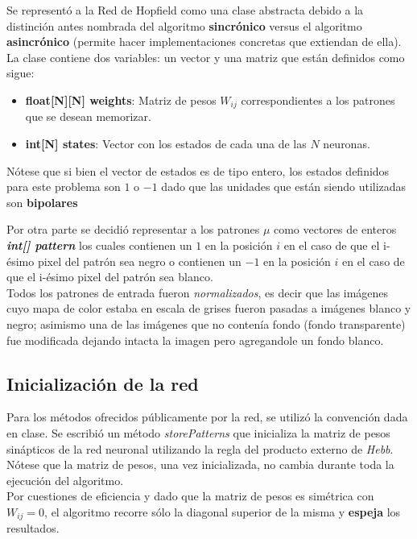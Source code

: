 \documentclass[%
    final,
    reprint,
    notitlepage,
    narroweqnarray,
    inline,
    twoside,
    invited
    ]{ieee}
\begin{document}
\par Se representó a la Red de Hopfield  como una clase abstracta debido a la distinción antes nombrada del algoritmo \textbf{sincrónico} versus el algoritmo \textbf{asincrónico} (permite hacer implementaciones concretas que extiendan de ella).\\
La clase contiene dos variables: un vector y una matriz que están definidos como sigue:\\

\begin{itemize}
\item \textbf{float[N][N] weights}: Matriz de pesos $W_{ij}$ correspondientes a los patrones que se desean memorizar.
\item \textbf{int[N] states}: Vector con los estados de cada una de las $N$ neuronas.\\
\end{itemize}

\par Nótese que si bien el vector de estados es de tipo entero, los estados definidos para este problema son $1$ o $-1$ dado que las unidades que están siendo utilizadas son \textbf{bipolares}\\

\par Por otra parte se decidió representar a los patrones $\mu$ como vectores de enteros \textbf{\textit{int[] pattern}} los cuales contienen un $1$ en la posición $i$ en el caso de que el i-ésimo pixel del patrón sea negro o contienen un $-1$ en la posición $i$ en el caso de que el i-ésimo pixel del patrón sea blanco.\\
Todos los patrones de entrada fueron \textit{normalizados}, es decir que las imágenes cuyo mapa de color estaba en escala de grises fueron pasadas a imágenes blanco y negro; asimismo una de las imágenes que no contenía fondo (fondo transparente) fue modificada dejando intacta la imagen pero agregandole un fondo blanco.
	

\subsection{Inicialización de la red}

\par Para los métodos ofrecidos públicamente por la red, se utilizó la convención dada en clase. Se escribió un método \textit{storePatterns} que inicializa la matriz de pesos sinápticos de la red neuronal utilizando la regla del producto externo de \textit{Hebb}. Nótese que la matriz de pesos, una vez inicializada, no cambia durante toda la ejecución del algoritmo.\\
Por cuestiones de eficiencia y dado que la matriz de pesos es simétrica con $W_{ij} = 0$, el algoritmo recorre sólo la diagonal superior de la misma y \textbf{espeja} los resultados.
\end{document}

